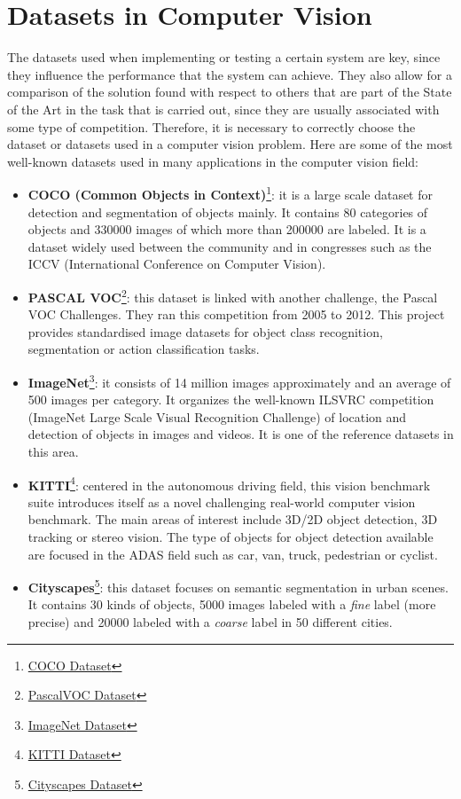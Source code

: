 \section{Datasets in Computer Vision}
The datasets used when implementing or testing a certain system are key, since they influence the performance that the system can achieve. They also allow for a comparison of the solution found with respect to others that are part of the State of the Art in the task that is carried out, since they are usually associated with some type of competition. Therefore, it is necessary to correctly choose the dataset or datasets used in a computer vision problem. Here are some of the most well-known datasets used in many applications in the computer vision field:
\begin{itemize}
\item \textbf{COCO (Common Objects in Context)}\footnote {\href{http://cocodataset.org/#home}{COCO Dataset}}: it is a large scale dataset for detection and segmentation of objects mainly. It contains 80 categories of objects and 330000 images of which more than 200000 are labeled. It is a dataset widely used between the community and in congresses such as the ICCV (International Conference on Computer Vision).
\item \textbf{PASCAL VOC}\footnote {\href{http://host.robots.ox.ac.uk/pascal/VOC/}{PascalVOC Dataset}}: this dataset is linked with another challenge, the Pascal VOC Challenges. They ran this competition from 2005 to 2012. This project provides standardised image datasets for object class recognition, segmentation or action classification tasks.
\item \textbf{ImageNet}\footnote {\href{http://www.image-net.org/}{ImageNet Dataset}}: it consists of 14 million images approximately and an average of 500 images per category. It organizes the well-known ILSVRC competition (ImageNet Large Scale Visual Recognition Challenge) of location and detection of objects in images and videos. It is one of the reference datasets in this area.
\item \textbf{KITTI}\footnote {\href{http://www.cvlibs.net/datasets/kitti/}{KITTI Dataset}}: centered in the autonomous driving field, this vision benchmark suite introduces itself as a novel challenging real-world computer vision benchmark. The main areas of interest include 3D/2D object detection, 3D tracking or stereo vision. The type of objects for object detection available are focused in the ADAS field such as car, van, truck, pedestrian or cyclist.
\item \textbf{Cityscapes}\footnote {\href{https://www.cityscapes-dataset.com/}{Cityscapes Dataset}}: this dataset focuses on semantic segmentation in urban scenes. It contains 30 kinds of objects, 5000 images labeled with a \textit{fine} label (more precise) and 20000 labeled with a \textit{coarse} label in 50 different cities.

\end{itemize}
